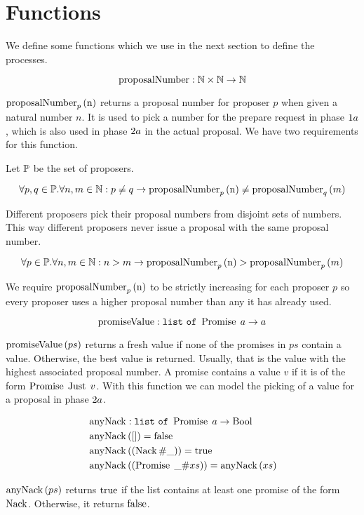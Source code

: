 \section{Functions}
We define some functions which we use in the next section to define the processes.

\[\operatorname{proposalNumber} : \mathbb{N} \times \mathbb{N} \to \mathbb{N}\]

$\operatorname{proposalNumber}_p\left( \operatorname{n}\right)$ returns a proposal number for proposer $p$ when given a natural number $n$.
It is used to pick a number for the prepare request in phase $1a$, which is also used in phase $2a$ in the actual proposal.
We have two requirements for this function.

Let $\mathbb{P}$ be the set of proposers.

\[\forall p,q \in \mathbb{P} . \forall n,m \in \mathbb{N}: p \neq q \to \operatorname{proposalNumber}_p\left( \operatorname{n}\right) \neq \operatorname{proposalNumber}_q\left( m\right)\]

Different proposers pick their proposal numbers from disjoint sets of numbers.
This way different proposers never issue a proposal with the same proposal number.

\[\forall p \in \mathbb{P} . \forall n,m \in \mathbb{N}: n > m \to \operatorname{proposalNumber}_p\left( \operatorname{n}\right) > \operatorname{proposalNumber}_p\left( m\right)\]

We require $\operatorname{proposalNumber}_p\left( \operatorname{n}\right)$ to be strictly increasing for each proposer $p$ so every proposer uses a higher proposal number than any it has already used.

\[\operatorname{promiseValue} : \mathtt{list\ of\ } \operatorname{Promise}\; a \to a\]

$\operatorname{promiseValue}\left(ps\right)$ returns a fresh value if none of the promises in $ps$ contain a value.
Otherwise, the best value is returned. Usually, that is the value with the highest associated proposal number.
A promise contains a value $v$ if it is of the form $\operatorname{Promise}\; \operatorname{Just}\; v$.
With this function we can model the picking of a value for a proposal in phase $2a$.

\begin{align*}
&\operatorname{anyNack} : \mathtt{list\ of\ } \operatorname{Promise}\; a \to \operatorname{Bool}\\
&\operatorname{anyNack}\left(\mathtt{[]}\right) = \operatorname{false}\\
&\operatorname{anyNack}\left(\left(\operatorname{Nack} \mathtt{\#} \mathtt{\_}\right)\right) = \operatorname{true}\\
&\operatorname{anyNack}\left(\left(\operatorname{Promise}\; \mathtt{\_} \mathtt{\#} xs\right)\right) = \operatorname{anyNack}\left(xs\right)
\end{align*}

$\operatorname{anyNack}\left(ps\right)$ returns $\operatorname{true}$ if the list contains at least one promise of the form $\operatorname{Nack}$.
Otherwise, it returns $\operatorname{false}$.

